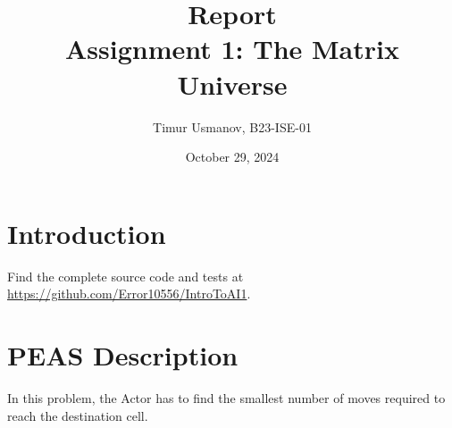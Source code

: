 \documentclass[10pt]{article}
\begin{document}
\title{Report\\Assignment 1: The Matrix Universe}
\author{Timur Usmanov, B23-ISE-01}
\date{October 29, 2024}
\maketitle

\section*{Introduction}
Find the complete source code and tests at \url{https://github.com/Error10556/IntroToAI1}.

\section{PEAS Description}

In this problem, the Actor has to find the smallest number of moves required to reach the destination cell.
\end{document}
